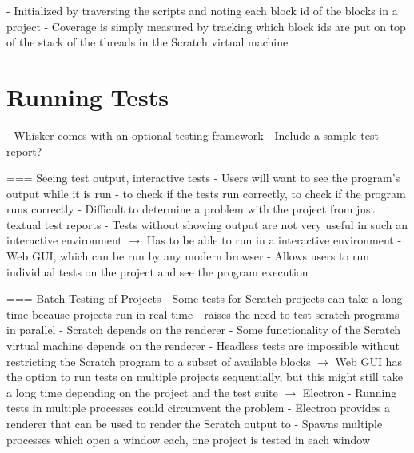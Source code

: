 - Initialized by traversing the scripts and noting each block id of the blocks in a project
- Coverage is simply measured by tracking which block ids are put on top of the stack of the threads in the Scratch virtual machine

\section{Running Tests}
\label{sec:running_tests}
- Whisker comes with an optional testing framework
- Include a sample test report?

=== Seeing test output, interactive tests
- Users will want to see the program's output while it is run
    - to check if the tests run correctly, to check if the program runs correctly
    - Difficult to determine a problem with the project from just textual test reports
    - Tests without showing output are not very useful in such an interactive environment
$\rightarrow$ Has to be able to run in a interactive environment
    - Web GUI, which can be run by any modern browser
    - Allows users to run individual tests on the project and see the program execution

=== Batch Testing of Projects
- Some tests for Scratch projects can take a long time because projects run in real time
    - raises the need to test scratch programs in parallel
    - Scratch depends on the renderer
        - Some functionality of the Scratch virtual machine depends on the renderer
        - Headless tests are impossible without restricting the Scratch program to a subset of available blocks
$\rightarrow$ Web GUI has the option to run tests on multiple projects sequentially, but this might still take a long time depending on the project and the test suite
$\rightarrow$ Electron
    - Running tests in multiple processes could circumvent the problem
    - Electron provides a renderer that can be used to render the Scratch output to
    - Spawns multiple processes which open a window each, one project is tested in each window
